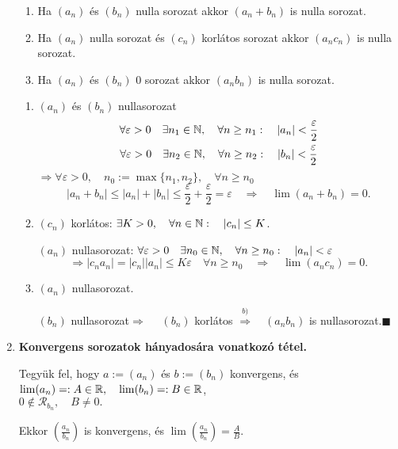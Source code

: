 \documentclass[a4paper,11.5pt]{article}
\begin{document}
\begin{enumerate}
		\begin{enumerate}
			\item Ha $(a_n)$ és $(b_n)$ nulla sorozat akkor $(a_n+b_n)$ is nulla sorozat.
			\item Ha $(a_n)$ nulla sorozat és $(c_n)$ korlátos sorozat akkor $(a_nc_n)$ is nulla sorozat.
			\item Ha $(a_n)$ és $(b_n)$ 0 sorozat akkor $(a_nb_n)$ is nulla sorozat.
		\end{enumerate}
		\biz
		\begin{enumerate}
			\item $(a_n)$ és $(b_n)$ nullasorozat
			\[\begin{gathered}
			\forall \varepsilon>0 \quad \exists n_1\in\mathbb{N}, \quad \forall n\geq n_1:\quad |a_n|<\frac{\varepsilon}{2}\\
			\forall \varepsilon>0 \quad \exists n_2\in\mathbb{N}, \quad \forall n\geq n_2:\quad |b_n|<\frac{\varepsilon}{2}
			\end{gathered}\]
			$\Rightarrow \forall\varepsilon>0,\quad  n_0:=\max\{ n_1,n_2 \}, \quad \forall n\geq n_0$
			\[ |a_n+b_n|\leq |a_n|+|b_n|\leq \frac{\varepsilon}{2}+\frac{\varepsilon}{2}=\varepsilon\quad  \Rightarrow\quad  \lim(a_n+b_n)=0. \]
			
			\item $(c_n)$ korlátos: \quad $\exists K>0,\quad \forall n\in \mathbb{N}:\quad |c_n|\leq K$.
			
			$(a_n)$ nullasorozat: \quad $
			\forall \varepsilon>0 \quad \exists n_0\in\mathbb{N}, \quad \forall n\geq n_0:\quad |a_n|<\varepsilon$
			\[ \Rightarrow |c_na_n|=|c_n||a_n|\leq K\varepsilon\quad \forall n\geq n_0 \quad \Rightarrow\quad \lim(a_nc_n)=0. \]
			
			\item $(a_n)$ nullasorozat.
			
			$(b_n)$ nullasorozat\quad  $\Rightarrow\quad $ $(b_n)$ korlátos \quad $\overset{b)}{\Longrightarrow}\quad  (a_nb_n)$ is nullasorozat.\quad $\blacksquare$
		\end{enumerate}
		
		\item \textbf{Konvergens sorozatok hányadosára vonatkozó tétel.}
		
		Tegyük fel, hogy $a:=(a_n)$ és $b:=(b_n)$ konvergens, és $\lim(a_n)=:A\in\mathbb{R},\quad  \lim(b_n)=:B\in\mathbb{R}$,\quad \\ $0\not\in\mathcal{R}_{b_n}, \quad B\not=0.$ 
		
		Ekkor $\displaystyle\left(\frac{a_n}{b_n}\right)$ is konvergens, és $\lim\displaystyle\left(\frac{a_n}{b_n}\right)=\frac{A}{B}.$
		

\end{enumerate}
\end{document}

